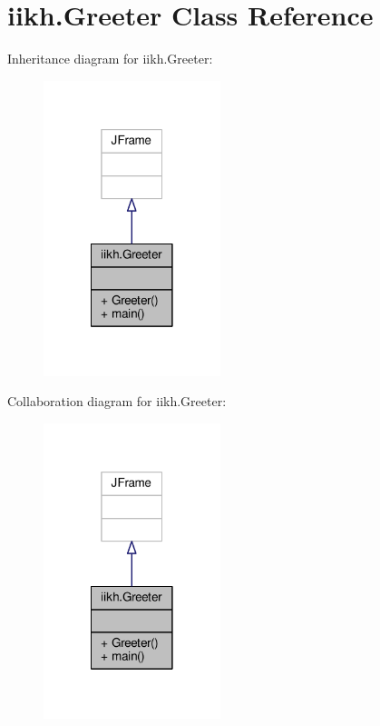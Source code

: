 \hypertarget{classiikh_1_1Greeter}{\section{iikh.\-Greeter Class Reference}
\label{classiikh_1_1Greeter}
}


Inheritance diagram for iikh.\-Greeter\-:
\nopagebreak
\begin{figure}[H]
\begin{center}
\leavevmode
\includegraphics[width=146pt]{classiikh_1_1Greeter__inherit__graph}
\end{center}
\end{figure}


Collaboration diagram for iikh.\-Greeter\-:
\nopagebreak
\begin{figure}[H]
\begin{center}
\leavevmode
\includegraphics[width=146pt]{classiikh_1_1Greeter__coll__graph}
\end{center}
\end{figure}
